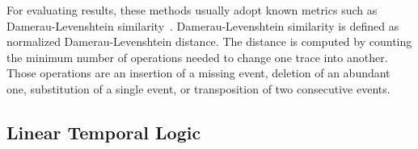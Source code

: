 

		
		
For evaluating results, these methods usually adopt known metrics such as Damerau-Levenshtein similarity~\cite{Damerau:1964:TCD:363958.363994}. Damerau-Levenshtein similarity is defined as normalized Damerau-Levenshtein distance. The distance is computed by counting the minimum number of operations needed to change one trace into another. Those operations are an insertion of a missing event, deletion of an abundant one, substitution of a single event, or transposition of two consecutive events. 




\subsection{Linear Temporal Logic}

